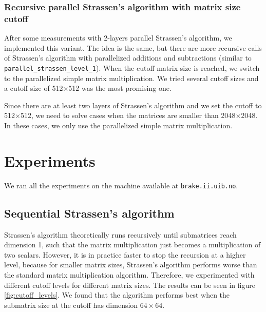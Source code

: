 \documentclass{article}
\begin{document}
\subsubsection{Recursive parallel Strassen's algorithm with matrix size cutoff}
After some measurements with 2-layers parallel Strassen's algorithm, we implemented this variant.
The idea is the same, but there are more recursive calls of Strassen's algorithm with parallelized
additions and subtractions (similar to \texttt{parallel\_strassen\_level\_1}). 
When the cutoff matrix size is reached, we switch to the parallelized simple matrix multiplication. We tried several cutoff sizes
and a cutoff size of 512$\times$512 was the most promising one.

Since there are at least two layers of Strassen's algorithm and we set the cutoff to 512$\times$512,
we need to solve cases when the matrices are smaller than 2048$\times$2048. In these cases, we only use the 
parallelized simple matrix multiplication.

\section{Experiments}

We ran all the experiments on the machine available at \texttt{brake.ii.uib.no}.

\subsection{Sequential Strassen's algorithm}

Strassen's algorithm theoretically runs recursively until submatrices reach dimension 1, such that the matrix multiplication just becomes a multiplication of two scalars.
However, it is in practice faster to stop the recursion at a higher level, because for smaller matrix sizes, Strassen's algorithm performs worse than the standard matrix multiplication algorithm. Therefore, we experimented with different cutoff levels for different matrix sizes. The results can be seen in figure \ref{fig:cutoff_levels}. We found that the algorithm performs best when the submatrix size at the cutoff has dimension $64 \times 64$.
\end{document}
